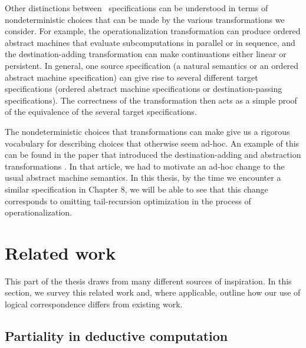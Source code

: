 Other distinctions between \sls~specifications can be understood in
terms of nondeterministic choices that can be made by the various
transformations we consider. For example, the operationalization
transformation can produce ordered abstract machines that evaluate
subcomputations in parallel or in sequence, and the destination-adding
transformation can make continuations either linear or persistent. In
general, one source specification (a natural semantics or an ordered
abstract machine specification) can give rise to several different
target specifications (ordered abstract machine specifications or
destination-passing specifications). The correctness of the
transformation then acts as a simple proof of the equivalence of the
several target specifications.

The nondeterministic choices that transformations can make give us a
rigorous vocabulary for describing choices that otherwise seem
ad-hoc. An example of this can be found in the paper that introduced
the destination-adding and abstraction transformations
\cite{simmons11logical}. In that article, we had to motivate an ad-hoc
change to the usual abstract machine semantics. In this thesis, by the
time we encounter a similar specification in Chapter 8, we will be
able to see that this change corresponds to omitting tail-recursion
optimization in the process of operationalization.

\section{Related work}

This part of the thesis draws from many different sources of
inspiration. In this section, we survey this related work and, where
applicable, outline how our use of logical correspondence differs from
existing work.

\subsection*{Partiality in deductive computation}

